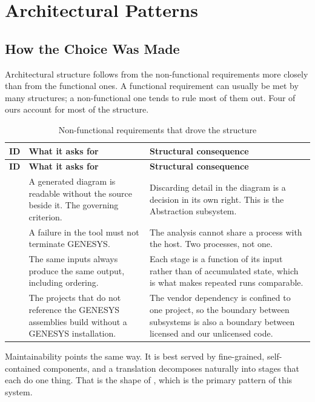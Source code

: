 \chapter{Architectural Patterns}
\label{ch:patterns}

\section{How the Choice Was Made}

Architectural structure follows from the non-functional requirements more
closely than from the functional ones. A functional requirement can usually be
met by many structures; a non-functional one tends to rule most of them out.
Four of ours account for most of the structure.

\begin{longtable}{L{0.14\textwidth}L{0.36\textwidth}L{0.42\textwidth}}
	\caption{Non-functional requirements that drove the structure}\label{tab:drivers}\\
	\toprule
	\textbf{ID} & \textbf{What it asks for} & \textbf{Structural consequence} \\
	\midrule
	\endfirsthead
	\toprule
	\textbf{ID} & \textbf{What it asks for} & \textbf{Structural consequence} \\
	\midrule
	\endhead

	 & A generated diagram is readable without the source beside
	it. The governing criterion. & Discarding detail in the diagram is a decision in its own
	right. This is the Abstraction subsystem. \\
	\addlinespace
	 & A failure in the tool must not terminate GENESYS. & The
	analysis cannot share a process with the host. Two processes, not one. \\
	\addlinespace
	 & The same inputs always produce the same output, including
	ordering. & Each stage is a function of its input rather than of
	accumulated state, which is what makes repeated runs comparable. \\
	\addlinespace
	 & The projects that do not reference the GENESYS assemblies
	build without a GENESYS installation. & The vendor dependency is confined
	to one project, so the boundary between subsystems is also a boundary
	between licensed and our unlicensed code. \\
	\bottomrule
\end{longtable}

Maintainability points the same way. It is best served by fine-grained,
self-contained components, and a translation decomposes naturally into stages
that each do one thing. That is the shape of , which is the primary pattern of this system.


